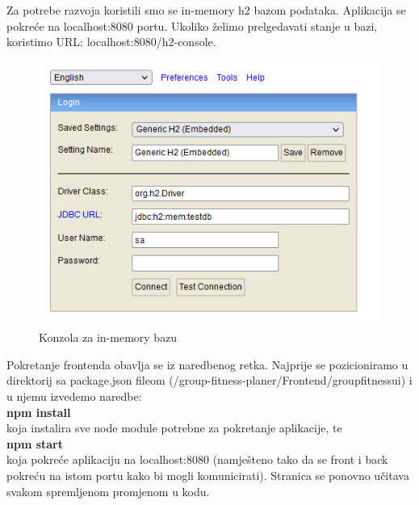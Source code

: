 {            {Za potrebe razvoja koristili smo se in-memory h2 bazom podataka. Aplikacija se pokreće na localhost:8080 portu. Ukoliko želimo prelgedavati stanje u bazi, koristimo URL: localhost:8080/h2-console. }
            \begin{figure}[H]
                      \includegraphics[scale=0.7]{./Slike/h2baza.png}
                      \centering
                      \caption{Konzola za in-memory bazu}
                      \label{fig:promjene}
                \end{figure}

            {Pokretanje frontenda obavlja se iz naredbenog retka. Najprije se pozicioniramo u direktorij sa package.json fileom (/group-fitness-planer/Frontend/groupfitnessui) i u njemu izvedemo naredbe:\\ 
            \textbf{npm install} \\
            koja instalira sve node module potrebne za pokretanje aplikacije, te \\
            \textbf{npm start} \\
            koja pokreće aplikaciju na localhost:8080 (namješteno tako da se front i back pokreću na istom portu kako bi mogli komunicirati). Stranica se ponovno učitava svakom spremljenom promjenom u kodu. 
            \\}
            
}
		
		
			
